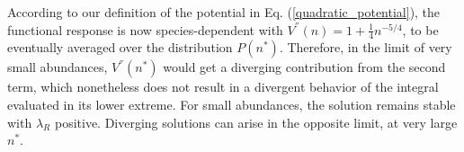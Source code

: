 \documentclass[12pt]{article}
\begin{document}
According to our definition of the potential in Eq. (\ref{quadratic_potential}), the functional response is now species-dependent with $V^{''}(n)=1+\frac{1}{4} n^{-5/4}$, to be eventually averaged over the distribution $P(n^{*})$. Therefore, in the limit of very small abundances, $V^{''}(n^{*})$ would get a diverging contribution from the second term, which nonetheless does not result in a divergent behavior of the integral evaluated in its lower extreme. For small abundances, the solution remains stable with $\lambda_R$ positive. Diverging solutions can arise in the opposite limit, at very large $n^{*}$.


\printbibliography
\end{document}
